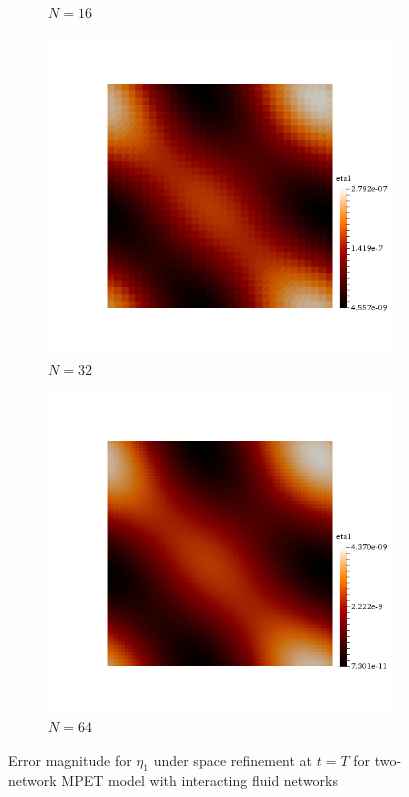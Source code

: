 \begin{figure}[h!]
\begin{subfigure}[b]{0.24\textwidth}
    \caption{$N=16$}
  \end{subfigure}
  \begin{subfigure}[b]{0.24\textwidth}
    \includegraphics[width=\textwidth,height=\textheight,keepaspectratio,height=\textheight,keepaspectratio]{figures/2_mpet/no_transfer/space/eta1_32.png}
    \caption{$N=32$}
  \end{subfigure}
  \begin{subfigure}[b]{0.24\textwidth}
    \includegraphics[width=\textwidth,height=\textheight,keepaspectratio,height=\textheight,keepaspectratio]{figures/2_mpet/no_transfer/space/eta1_64.png}
    \caption{$N=64$}
  \end{subfigure}
  \caption{Error magnitude for $\eta_1$ under space refinement at $t=T$ for two-network MPET model with interacting fluid networks} \label{fig:bb_default_eta1}
\end{figure}

